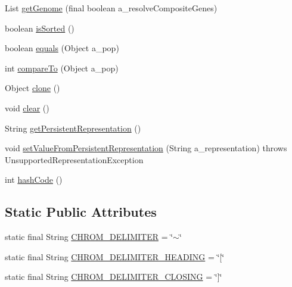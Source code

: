 \begin{DoxyCompactItemize}
\item 
List \hyperlink{classorg_1_1jgap_1_1_population_a1236240ac1bfdcd7848a268f099ede8e}{get\-Genome} (final boolean a\-\_\-resolve\-Composite\-Genes)
\item 
boolean \hyperlink{classorg_1_1jgap_1_1_population_a959e9940968abe5de202542a7a26c990}{is\-Sorted} ()
\item 
boolean \hyperlink{classorg_1_1jgap_1_1_population_ab415c85cc397ce6d54924c4d14aa8cf6}{equals} (Object a\-\_\-pop)
\item 
int \hyperlink{classorg_1_1jgap_1_1_population_a7671499966b4ffb937d45e373c6e95d9}{compare\-To} (Object a\-\_\-pop)
\item 
Object \hyperlink{classorg_1_1jgap_1_1_population_a5c3b2ec3c218d3699dd4d452a2449748}{clone} ()
\item 
void \hyperlink{classorg_1_1jgap_1_1_population_a4e4c5b7e98055340e9f0b073be13d24b}{clear} ()
\item 
String \hyperlink{classorg_1_1jgap_1_1_population_afeedd380ea603cdefb5ef871f2bdf99e}{get\-Persistent\-Representation} ()
\item 
void \hyperlink{classorg_1_1jgap_1_1_population_a5cb0aa594a5d3d089ea0cadbe9a002e8}{set\-Value\-From\-Persistent\-Representation} (String a\-\_\-representation)  throws Unsupported\-Representation\-Exception 
\item 
int \hyperlink{classorg_1_1jgap_1_1_population_ad6e08d20ae2bfc6d277c84f5309cac49}{hash\-Code} ()
\end{DoxyCompactItemize}
\subsection*{Static Public Attributes}
\begin{DoxyCompactItemize}
\item 
static final String \hyperlink{classorg_1_1jgap_1_1_population_a8fd43176ca6c601491bb9cf2674d9c42}{C\-H\-R\-O\-M\-\_\-\-D\-E\-L\-I\-M\-I\-T\-E\-R} = \char`\"{}$\sim$\char`\"{}
\item 
static final String \hyperlink{classorg_1_1jgap_1_1_population_af6282eaa6a1d7a0218d85db1b36960a4}{C\-H\-R\-O\-M\-\_\-\-D\-E\-L\-I\-M\-I\-T\-E\-R\-\_\-\-H\-E\-A\-D\-I\-N\-G} = \char`\"{}\mbox{[}\char`\"{}
\item 
static final String \hyperlink{classorg_1_1jgap_1_1_population_a35f548ce2820e079590565c66bae85aa}{C\-H\-R\-O\-M\-\_\-\-D\-E\-L\-I\-M\-I\-T\-E\-R\-\_\-\-C\-L\-O\-S\-I\-N\-G} = \char`\"{}\mbox{]}\char`\"{}
\end{DoxyCompactItemize}
